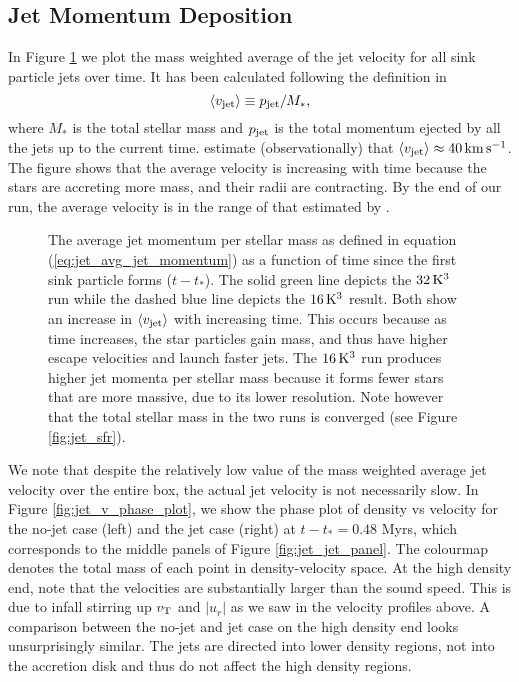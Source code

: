 \documentclass[../dissertation.tex]{subfiles}
\begin{document}

\subsection{Jet Momentum Deposition} \label{subsec:jet_jet_mv}
In Figure \ref{fig:jet_avg_jet_velocity} we plot the mass weighted average of the jet velocity for all sink particle jets over time.
It has been calculated following the definition in \citet{2000ApJ...545..364M}
\begin{equation}
\langle v_{\rm jet} \rangle \equiv p_{\rm jet} / M_* ,
\label{eq:jet_avg_jet_momentum}
\end{equation}
where $M_*$ is the total stellar mass and $p_{\rm jet}$ is the total momentum ejected by all the jets up to the current time.
\citet{2000ApJ...545..364M} estimate (observationally) that $\langle v_{\rm jet}\rangle \approx 40 \, {\rm km \, s^{-1}}$.
The figure shows that the average velocity is increasing with time because the stars are accreting more mass, and their radii are contracting.
By the end of our run, the average velocity is in the range of that estimated by \citet{2000ApJ...545..364M}.

%
\begin{figure}[htb] %
  \caption[Jet - Jet momentum over time]{The average jet momentum per stellar mass as defined in equation (\ref{eq:jet_avg_jet_momentum}) as a function of time since the first sink particle forms ($t-t_*$). The solid green line depicts the $32 \, {\rm K^3}$ run while the dashed blue line depicts the $16 \, {\rm K^3}$ result. Both show an increase in $\langle v_{\rm jet} \rangle$ with increasing time. This occurs because as time increases, the star particles gain mass, and thus have higher escape velocities and launch faster jets. The $16 \, {\rm K^3}$ run produces higher jet momenta per stellar mass because it forms fewer stars that are more massive, due to its lower resolution. Note however that the total stellar mass in the two runs is converged (see Figure \ref{fig:jet_sfr}).}
    \label{fig:jet_avg_jet_velocity}
\end{figure}
%

We note that despite the relatively low value of the mass weighted average jet velocity over the entire box, the actual jet velocity is not necessarily slow.
In Figure \ref{fig:jet_v_phase_plot}, we show the phase plot of density vs velocity for the no-jet case (left) and the jet case (right) at $t-t_*=0.48$ Myrs, which corresponds to the middle panels of Figure \ref{fig:jet_jet_panel}.
The colourmap denotes the total mass of each point in density-velocity space.
At the high density end, note that the velocities are substantially larger than the sound speed.
This is due to infall stirring up $v_{\rm T}$ and $\lvert u_r \rvert$ as we saw in the velocity profiles above.
A comparison between the no-jet and jet case on the high density end looks unsurprisingly similar.
The jets are directed into lower density regions, not into the accretion disk and thus do not affect the high density regions.
\end{document}
